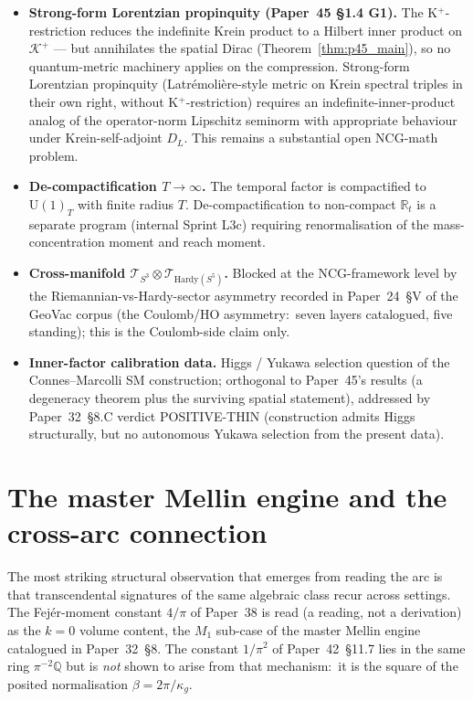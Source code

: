 \documentclass[11pt,a4paper]{article}
\theoremstyle{plain}
\theoremstyle{definition}
\newcommand{\sthree}{S^{3}}
\newcommand{\sfive}{S^{5}}
\newcommand{\DL}{D_{L}}
\newcommand{\Kplus}{\mathcal{K}^{+}}
\newcommand{\Tcal}{\mathcal{T}}
\newcommand{\R}{\mathbb{R}}
\newcommand{\Q}{\mathbb{Q}}
\newcommand{\Uone}{\mathrm{U}(1)}
\begin{document}
\begin{itemize}\setlength\itemsep{0pt}
\item[(Q1)] \textbf{Strong-form Lorentzian propinquity (Paper~45
\S 1.4 G1).}
The K$^{+}$-restriction reduces the indefinite Krein product to a
Hilbert inner product on $\Kplus$ --- but annihilates the spatial
Dirac (Theorem~\ref{thm:p45_main}), so no quantum-metric machinery
applies on the compression.  Strong-form Lorentzian propinquity
(Latr\'emoli\`ere-style metric on Krein spectral triples in their own
right, without K$^{+}$-restriction) requires an indefinite-inner-product
analog of the operator-norm Lipschitz seminorm with appropriate
behaviour under Krein-self-adjoint $\DL$.  This remains a
substantial open NCG-math problem.
\item[(G2)] \textbf{De-compactification $T \to \infty$.}  The temporal
factor is compactified to $\Uone_{T}$ with finite radius $T$.
De-compactification to non-compact $\R_{t}$ is a separate program
(internal Sprint L3c) requiring renormalisation of the
mass-concentration moment and reach moment.
\item[(G3)] \textbf{Cross-manifold $\Tcal_{\sthree} \otimes
\Tcal_{\mathrm{Hardy}(\sfive)}$.}  Blocked at the NCG-framework level
by the Riemannian-vs-Hardy-sector asymmetry recorded in Paper~24~\S V
of the GeoVac corpus (the Coulomb/HO asymmetry:\ seven layers
catalogued, five standing); this is
the Coulomb-side claim only.
\item[(G4)] \textbf{Inner-factor calibration data.}  Higgs / Yukawa
selection question of the Connes--Marcolli SM construction;
orthogonal to Paper~45's results (a degeneracy theorem plus the
surviving spatial statement), addressed by
Paper~32~\S 8.C verdict POSITIVE-THIN (construction admits Higgs
structurally, but no autonomous Yukawa selection from the present
data).
\end{itemize}

\section{The master Mellin engine and the cross-arc connection}
\label{sec:mellin}

The most striking structural observation that emerges from reading
the arc is that transcendental signatures of the same algebraic class
recur across settings.  The Fej\'er-moment constant $4/\pi$ of Paper~38 is read (a
reading, not a derivation) as the $k = 0$ volume content, the $M_{1}$
sub-case of the master Mellin engine catalogued in Paper~32~\S 8.  The
constant $1/\pi^{2}$ of Paper~42~\S 11.7 lies in the same ring
$\pi^{-2}\Q$ but is \emph{not} shown to arise from that mechanism:\ it is
the square of the posited normalisation $\beta = 2\pi/\kappa_g$.
\end{document}
